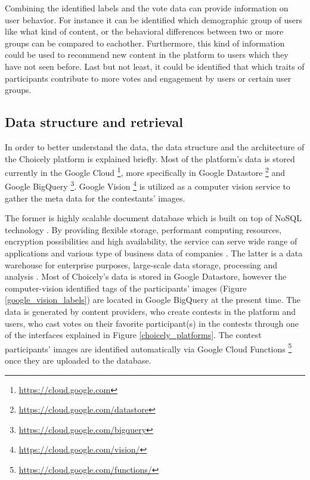     Combining the identified labels and the vote data can provide information on user behavior. For instance it can be identified which demographic group of users like what kind of content, or the behavioral differences between two or more groups can be compared to eachother. Furthermore, this kind of information could be used to recommend new content in the platform to users which they have not seen before. Last but not least, it could be identified that which traits of participants contribute to more votes and engagement by users or certain user groups.  
    
    \subsection{Data structure and retrieval}
    In order to better understand the data, the data structure and the architecture of the Choicely platform is explained briefly. Most of the platform's data is stored currently in the Google Cloud \footnote{\url{https://cloud.google.com}}, more specifically in Google Datastore \footnote{\url{https://cloud.google.com/datastore}} and Google BigQuery \footnote{\url{https://cloud.google.com/bigquery}}. Google Vision \footnote{\url{https://cloud.google.com/vision/}} is utilized as a computer vision service to gather the meta data for the contestants' images. 
    
    The former is highly scalable document database which is built on top of NoSQL technology \cite{google-datastore-overview}. By providing flexible storage, performant computing resources, encryption possibilities and high availability, the service can serve wide range of applications and various type of business data of companies \cite{google-datastore-overview}. The latter is a data warehouse for enterprise purposes, large-scale data storage, processing and analysis \cite{google-bigquery-overview}. Most of Choicely's data is stored in Google Datastore, however the computer-vision identified tags of the participants' images (Figure \ref{google_vision_labels}) are located in Google BigQuery at the present time. The data is generated by content providers, who create contests in the platform and users, who cast votes on their favorite participant(s) in the contests through one of the interfaces explained in Figure \ref{choicely_platforms}. The contest participants' images are identified automatically via Google Cloud Functions \footnote{\url{https://cloud.google.com/functions/}} once they are uploaded to the database.

